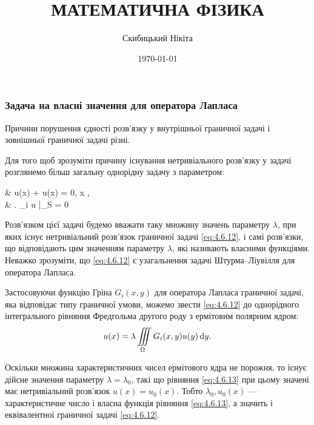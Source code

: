 

\title{{\Huge МАТЕМАТИЧНА ФІЗИКА}}
\author{Скибицький Нікіта}
\date{\today}





\tableofcontents

\setcounter{section}{4}
\setcounter{subsection}{6}
\setcounter{subsubsection}{0}
\setcounter{equation}{11}

\subsubsection{Задача на власні значення для оператора Лапласа}

Причини порушення єдності розв'язку у внутрішньої граничної задачі  і зовнішньої граничної задачі  різні. \medskip

Для того щоб зрозуміти причину існування нетривіального розв'язку у задачі  розглянемо більш загальну однорідну задачу з параметром:
\begin{system}
	\label{eq:4.6.12}
	& \Delta u(x) + \lambda u(x) = 0, \quad x \in \Omega, \\
	& \left. \ell_i u \right|_S = 0
\end{system}

Розв'язком цієї задачі будемо вважати таку множину значень параметру $\lambda$, при яких існує нетривіальний розв'язок граничної задачі \eqref{eq:4.6.12}, і самі розв'язки, що відповідають цим значенням параметру $\lambda$, які називають власними функціями. Неважко зрозуміти, що \eqref{eq:4.6.12} є узагальнення задачі Штурма--Ліувілля для оператора Лапласа. \medskip

Застосовуючи функцію Гріна $G_i(x, y)$ для оператора Лапласа граничної задачі, яка відповідає типу граничної умови, можемо звести \eqref{eq:4.6.12} до однорідного інтегрального рівняння Фредгольма другого роду з ермітовим полярним ядром:
\begin{equation}
	\label{eq:4.6.13}
	u(x) = \lambda \displaystyle\iiint\limits_\Omega G_i(x, y) u(y) \mathop{}\!\mathrm{d} y.
\end{equation}

Оскільки множина характеристичних чисел ермітового ядра не порожня, то існує дійсне значення параметру $\lambda = \lambda_0$, такі що рівняння \eqref{eq:4.6.13} при цьому значені має нетривіальний розв'язок $u(x) = u_0(x)$. Тобто $\lambda_0, u_0(x)$ --- характеристичне число і власна функція рівняння \eqref{eq:4.6.13}, а значить і еквівалентної граничної задачі \eqref{eq:4.6.12}. \medskip


